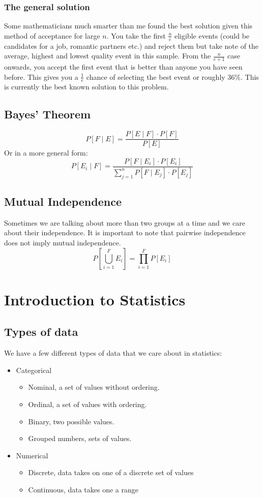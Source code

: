 \documentclass[12pt]{article}
\begin{document}
\subsubsection*{The general solution}
Some mathematicians much smarter than me found the best solution given this method of acceptance for large \(n\). You take the first \(\frac{n}{e}\) eligible events (could be candidates for a job, romantic partners etc.) and reject them but take note of the average, highest and lowest quality event in this sample. From the \(\frac{n}{e+1}\) case onwards, you accept the first event that is better than anyone you have seen before. This gives you a \(\frac{1}{e}\) chance of selecting the best event or roughly 36\%. This is currently the best known solution to this problem. 
\subsection*{Bayes' Theorem}
\[P[F\mid E]=\frac{P[E\mid F]\cdot P[F]}{P[E]}\]
Or in a more general form:
\[P[E_i\mid F]=\frac{P[F\mid E_i]\cdot P[E_i]}{\sum_{j=1}^nP[F\mid E_j]\cdot P[E_j]}\]
\subsection*{Mutual Independence}
Sometimes we are talking about more than two groups at a time and we care about their independence. It is important to note that pairwise independence does not imply mutual independence.
\[P\left[\bigcup_{i=1}^FE_i\right]=\prod_{i=1}^F P[E_i]\]
\section{Introduction to Statistics}
\subsection*{Types of data}
We have a few different types of data that we care about in statistics:
\begin{itemize}
    \item Categorical
    \begin{itemize}
        \item Nominal, a set of values without ordering.
        \item Ordinal, a set of values with ordering.
        \item Binary, two possible values.
        \item Grouped numbers, sets of values.
    \end{itemize}
    \item Numerical
    \begin{itemize}
        \item Discrete, data takes on one of a discrete set of values
        \item Continuous, data takes one a range 
    \end{itemize}
\end{itemize}
\end{document}

